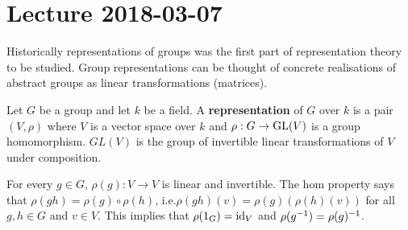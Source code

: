 \section{Lecture 2018-03-07}

Historically representations of groups was the first part of representation theory to be studied.
Group representations can be thought of concrete realisations of abstract groups as linear transformations (matrices).

\begin{defn}
	Let $G$ be a group and let $k$ be a field.
	A \textbf{representation} of $G$ over $k$ is a pair $(V,\rho)$ where $V$ is a vector space over $k$ and $\rho: G \to \operatorname{GL}(V)$ is a group homomorphism.
	$GL(V)$ is the group of invertible linear transformations of $V$ under composition.
\end{defn}

\begin{rmk}
	For every $g \in G$, $\rho(g):V \to V$ is linear and invertible.
	The hom property says that $\rho(gh)=\rho(g)\circ\rho(h)$, i.e.\@ $\rho(gh)(v) = \rho(g)\left(\rho(h)(v)\right)$ for all $g,h \in G$ and $v \in V$.
	This implies that $\rho(1_G)=\operatorname{id}_V$ and $\rho(g^{-1})=\rho(g)^{-1}$.	
\end{rmk}

